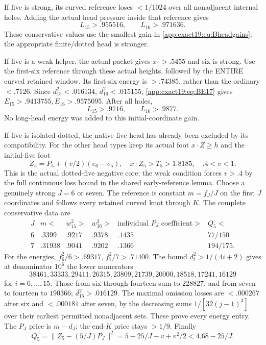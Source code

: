 \documentclass[11pt]{article}
\theoremstyle{definition}
\theoremstyle{remark}
\begin{document}
If five is strong, its curved
reference loses \(<1/1024\) over
all nonadjacent internal holes.
Adding the actual head pressure
inside that reference gives
\[
                   L_{15}>.955516,\qquad L_{16}>.971636 .
\]
These conservative values use the
smallest gain in
\eqref{app:exact19:eq:Bheadgains};
the appropriate finite/dotted head
is stronger.

If five is a weak helper, the
actual packet gives \(x_1>.5455\)
and six is strong.
Use the first-six reference through
these actual heights, followed by
the ENTIRE curved retained window.
Its first-six energy is \(>.74385\),
rather than the ordinary \(<.7126\).
Since \(d_{15}^2<.016134\),
\(d_{16}^2<.015155\),
\eqref{app:exact19:eq:BE17} gives
\(E_{15}>.9413755,E_{16}>.9575095\).
After all holes,
\[
                          L_{15}>.9716,\qquad L_{16}>.9877 .
\]
No long-head energy was added to
this initial-coordinate gain.

If five is isolated dotted,
the native-five head has already
been excluded by its compatibility.
For the other head types keep its
actual foot \(x\cdot Z\ge h\)
and the initial-five foot
\[
 Z_5=P_5+(v/2)(e_6-e_5),\quad
                x\cdot Z_5>T_5>1.8185,\quad .4<v<1 .
\]
This is the actual dotted-five
negative core; the weak condition
forces \(v>.4\) by the full
continuous loss bound in the
shared early-reference lemma.
Choose a genuinely strong
\(J=6\) or seven.
The reference is constant
\(m=f_J/J\) on the first \(J\)
coordinates and follows every
retained curved knot through \(K\).
The complete conservative data are
\[
\begin{array}{c|c|c|c|c|c}
 J&m<&w_{15}^2>&w_{16}^2>&
 \text{individual }P_J\text{ coefficient}>&Q_5<\\ \hline
 6&.3399&.9217&.9378&.1435&77/150\\
 7&.31938&.9041&.9202&.1366&194/175 .
\end{array}
\]
For the energies, \(f_6^2/6>.69317\),
\(f_7^2/7>.71400\).
The bound \(d_i^2>1/(4i+2)\) gives
at denominator \(10^6\) the lower
numerators
\[
38461,33333,29411,26315,23809,21739,
20000,18518,17241,16129
\]
for \(i=6,\ldots,15\).
Those from six through fourteen sum to \(228827\),
and from seven to fourteen to
\(190366\); \(d_{15}^2>.016129\).
The maximal omission losses are
\(<.000267\) after six and
\(<.000181\) after seven, by the
decreasing sums \(1/[32(j-1)^3]\)
over their earliest permitted
nonadjacent sets.
These prove every energy entry.
The \(P_J\) price is \(m-d_J\);
the end-\(K\) price stays \(>1/9\).
Finally
\[
 Q_5=\|Z_5-(5/J)P_J\|^2
          =5-25/J-v+v^2/2<4.68-25/J .
\]
\end{document}
